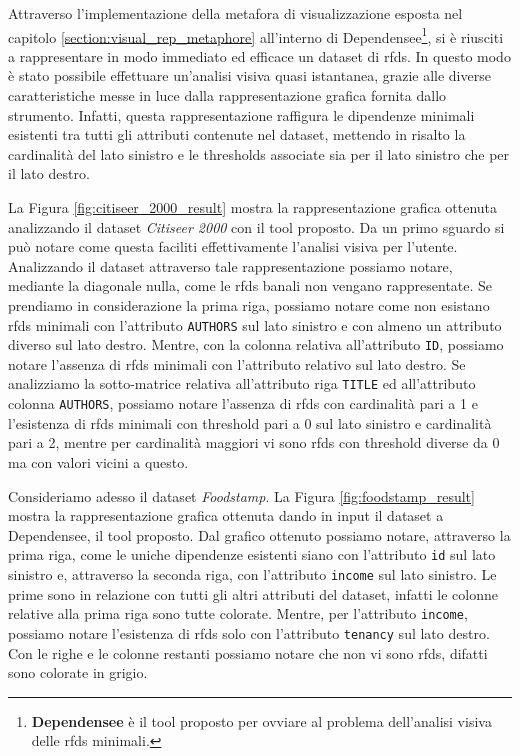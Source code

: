 Attraverso l'implementazione della metafora di visualizzazione esposta nel capitolo \ref{section:visual_rep_metaphore} all'interno di Dependensee\footnote{\textbf{Dependensee} \`{e} il tool proposto per ovviare al problema dell'analisi visiva delle \acrshort{rfds} minimali.}, si \`{e} riusciti a rappresentare in modo immediato ed efficace un dataset di \acrlong{rfds}. In questo modo \`{e} stato possibile effettuare un'analisi visiva quasi istantanea, grazie alle diverse caratteristiche messe in luce dalla rappresentazione grafica fornita dallo strumento. Infatti, questa rappresentazione raffigura le dipendenze minimali esistenti tra tutti gli attributi contenute nel dataset, mettendo in risalto la cardinalit\`{a} del lato sinistro e le thresholds associate sia per il lato sinistro che per il lato destro.\par
La Figura \ref{fig:citiseer_2000_result} mostra la rappresentazione grafica ottenuta analizzando il dataset \textit{Citiseer 2000} con il tool proposto. Da un primo sguardo si pu\`{o} notare come questa faciliti effettivamente l'analisi visiva per l'utente. Analizzando il dataset attraverso tale rappresentazione possiamo notare, mediante la diagonale nulla, come le \acrfull{rfds} banali non vengano rappresentate. Se prendiamo in considerazione la prima riga, possiamo notare come non esistano \acrfull{rfds} minimali con l'attributo \texttt{AUTHORS} sul lato sinistro e con almeno un attributo diverso sul lato destro. Mentre, con la colonna relativa all'attributo \texttt{ID}, possiamo notare l'assenza di \acrfull{rfds} minimali con l'attributo relativo sul lato destro. Se analizziamo la sotto-matrice relativa all'attributo riga \texttt{TITLE} ed all'attributo colonna \texttt{AUTHORS}, possiamo notare l'assenza di \acrfull{rfds} con cardinalit\`{a} pari a 1 e l'esistenza di \acrfull{rfds} minimali con threshold pari a 0 sul lato sinistro e cardinalit\`{a} pari a 2, mentre per cardinalit\`{a} maggiori vi sono \acrfull{rfds} con threshold diverse da 0 ma con valori vicini a questo.\par
Consideriamo adesso il dataset \textit{Foodstamp}. La Figura \ref{fig:foodstamp_result} mostra la rappresentazione grafica ottenuta dando in input il dataset a Dependensee, il tool proposto. Dal grafico ottenuto possiamo notare, attraverso la prima riga, come le uniche dipendenze esistenti siano con l'attributo \texttt{id} sul lato sinistro e, attraverso la seconda riga, con l'attributo \texttt{income} sul lato sinistro. Le prime sono in relazione con tutti gli altri attributi del dataset, infatti le colonne relative alla prima riga sono tutte colorate. Mentre, per l'attributo \texttt{income}, possiamo notare l'esistenza di \acrfull{rfds} solo con l'attributo \texttt{tenancy} sul lato destro. Con le righe e le colonne restanti possiamo notare che non vi sono \acrfull{rfds}, difatti sono colorate in grigio.

